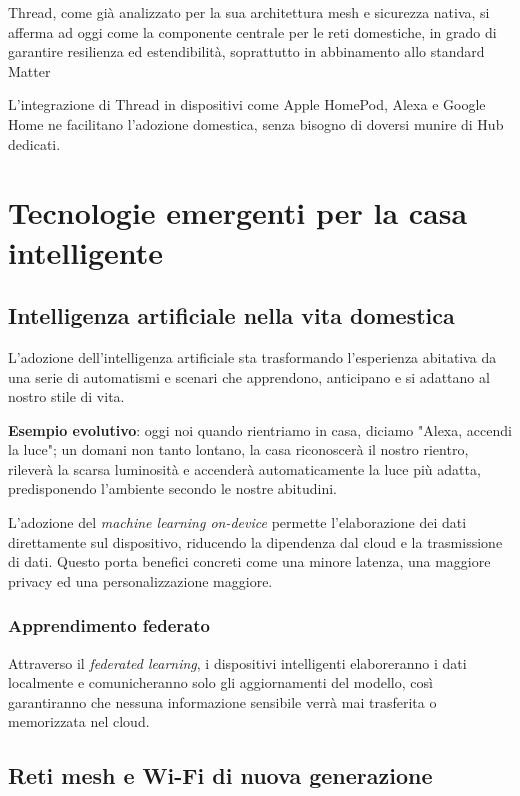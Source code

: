 Thread, come già analizzato per la sua architettura mesh e sicurezza nativa, si afferma ad oggi come la componente centrale per le reti domestiche, in grado di garantire resilienza ed estendibilità, soprattutto in abbinamento allo standard Matter 

L’integrazione di Thread in dispositivi come Apple HomePod, Alexa e Google Home ne facilitano l’adozione domestica, senza bisogno di doversi munire di Hub dedicati.

\section{Tecnologie emergenti per la casa intelligente}

\subsection{Intelligenza artificiale nella vita domestica}

L'adozione dell’intelligenza artificiale sta trasformando l’esperienza abitativa da una serie di automatismi e scenari che apprendono, anticipano e si adattano al nostro stile di vita.

\textbf{Esempio evolutivo}: oggi noi quando rientriamo in casa, diciamo "Alexa, accendi la luce"; un domani non tanto lontano, la casa riconoscerà il nostro rientro, rileverà la scarsa luminosità e accenderà automaticamente la luce più adatta, predisponendo l’ambiente secondo le nostre abitudini.

L’adozione del \textit{machine learning on-device} permette l’elaborazione dei dati direttamente sul dispositivo, riducendo la dipendenza dal cloud e la trasmissione di dati. Questo porta benefici concreti come una minore latenza, una maggiore privacy ed una personalizzazione maggiore.

\subsubsection{Apprendimento federato}

Attraverso il \textit{federated learning}, i dispositivi intelligenti elaboreranno i dati localmente e comunicheranno solo gli aggiornamenti del modello, così garantiranno che nessuna informazione sensibile verrà mai trasferita o memorizzata nel cloud.

\subsection{Reti mesh e Wi-Fi di nuova generazione}

